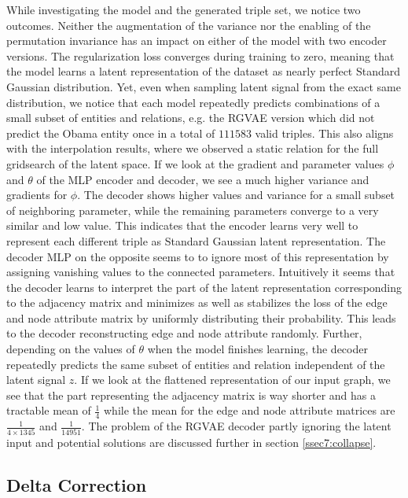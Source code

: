 While investigating the model and the generated triple set, we notice two outcomes. Neither the augmentation of the variance nor the enabling of the permutation invariance has an impact on either of the model with two encoder versions. The regularization loss converges during training to zero, meaning that the model learns a latent representation of the dataset as  nearly perfect Standard Gaussian distribution. Yet, even when sampling latent signal from the exact same distribution, we notice that each model repeatedly predicts combinations of a small subset of entities and relations, e.g. the RGVAE version which did not predict the Obama entity once in a total of $111583$ valid triples. This also aligns with the interpolation results, where we observed a static relation for the full gridsearch of the latent space. If we look at the gradient and parameter values $\phi$ and $\theta$ of the MLP encoder and decoder, we see a much higher variance and gradients for $\phi$. The decoder shows higher values and variance for a small subset of neighboring parameter, while the remaining parameters converge to a very similar and low value. This indicates that the encoder learns very well to represent each different triple as Standard Gaussian latent representation. The decoder MLP on the opposite seems to to ignore most of this representation by assigning vanishing values to the connected parameters. Intuitively it seems that the decoder learns to interpret the part of the latent representation corresponding to the adjacency matrix and minimizes as well as stabilizes the loss of the edge and node attribute matrix by uniformly distributing their probability. This leads to the decoder reconstructing edge and node attribute randomly. Further, depending on the values of $\theta$ when the model finishes learning, the decoder repeatedly predicts the same subset of entities and relation independent of the latent signal $z$. If we look at the flattened representation of our input graph, we see that the part representing the adjacency matrix is way shorter and has a tractable mean of $\frac{1}{4}$ while the mean for the edge and node attribute matrices are $\frac{1}{{4 \times 1345}}$ and $\frac{1}{14951}$. The problem of the RGVAE decoder partly ignoring the latent input and potential solutions are discussed further in section \ref{ssec7:collapse}. 


\subsection{Delta Correction}
\label{ssec5:delta}

